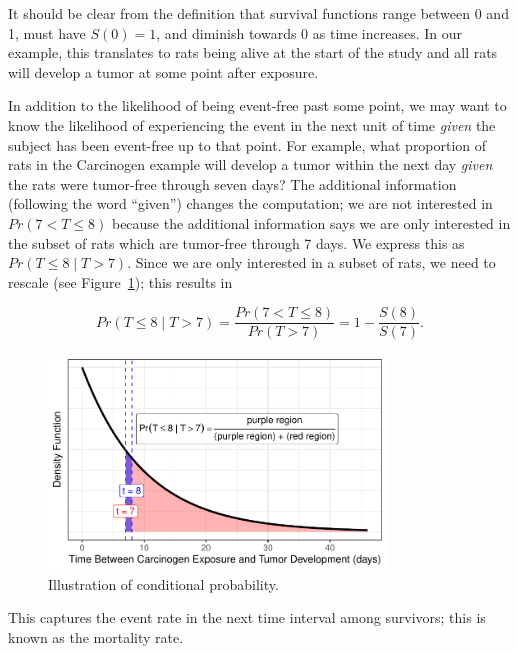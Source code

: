 \documentclass[
  letterpaper,
  DIV=11,
  numbers=noendperiod]{scrreprt}
\theoremstyle{definition}
\theoremstyle{definition}
\theoremstyle{remark}
\begin{document}
It should be clear from the definition that survival functions range
between 0 and 1, must have \(S(0) = 1\), and diminish towards 0 as time
increases. In our example, this translates to rats being alive at the
start of the study and all rats will develop a tumor at some point after
exposure.

In addition to the likelihood of being event-free past some point, we
may want to know the likelihood of experiencing the event in the next
unit of time \emph{given} the subject has been event-free up to that
point. For example, what proportion of rats in the Carcinogen example
will develop a tumor within the next day \emph{given} the rats were
tumor-free through seven days? The additional information (following the
word ``given'') changes the computation; we are not interested in
\(Pr(7 < T \leq 8)\) because the additional information says we are only
interested in the subset of rats which are tumor-free through 7 days. We
express this as \(Pr(T \leq 8 \mid T > 7)\). Since we are only
interested in a subset of rats, we need to rescale (see
Figure~\ref{fig-surv-conditional-probability}); this results in

\[Pr(T \leq 8 \mid T > 7) = \frac{Pr(7 < T \leq 8)}{Pr(T > 7)} = 1 - \frac{S(8)}{S(7)}.\]

\begin{figure}

{\centering \includegraphics[width=0.8\textwidth,height=\textheight]{./images/fig-surv-conditional-probability-1.pdf}

}

\caption{\label{fig-surv-conditional-probability}Illustration of
conditional probability.}

\end{figure}

This captures the event rate in the next time interval among survivors;
this is known as the mortality rate.
\end{document}
